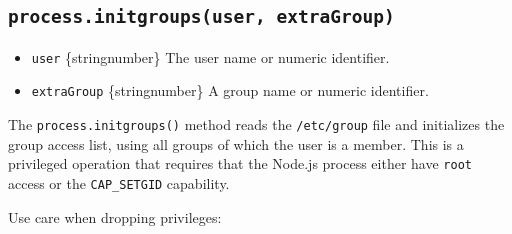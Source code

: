 \subsection{\texorpdfstring{\texttt{process.initgroups(user,\ extraGroup)}}{process.initgroups(user, extraGroup)}}\label{process.initgroupsuser-extragroup}

\begin{itemize}
\tightlist
\item
  \texttt{user} \{string\textbar number\} The user name or numeric
  identifier.
\item
  \texttt{extraGroup} \{string\textbar number\} A group name or numeric
  identifier.
\end{itemize}

The \texttt{process.initgroups()} method reads the \texttt{/etc/group}
file and initializes the group access list, using all groups of which
the user is a member. This is a privileged operation that requires that
the Node.js process either have \texttt{root} access or the
\texttt{CAP\_SETGID} capability.

Use care when dropping privileges:

\begin{Shaded}
\begin{Highlighting}[]
\OperatorTok{,}\OperatorTok{,} \OperatorTok{;}

\NormalTok{(}\NormalTok{())}\OperatorTok{;}         \CommentTok{// [ 0 ]}
\NormalTok{(}\OperatorTok{,} \NormalTok{)}\OperatorTok{;}     
\NormalTok{(}\NormalTok{())}\OperatorTok{;}         \CommentTok{// [ 27, 30, 46, 1000, 0 ]}
\NormalTok{(}\NormalTok{)}\OperatorTok{;}                     
\NormalTok{(}\NormalTok{())}\OperatorTok{;}         \CommentTok{// [ 27, 30, 46, 1000 ]}
\end{Highlighting}
\end{Shaded}


